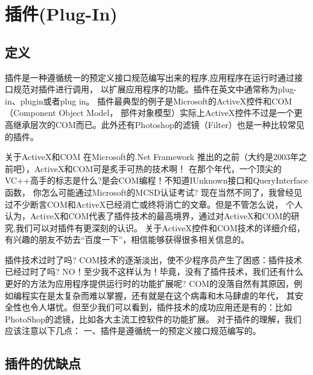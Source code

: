 \documentclass{book}
\begin{document}
\section{插件(Plug-In)}

\subsection{定义}

插件是一种遵循统一的预定义接口规范编写出来的程序,应用程序在运行时通过接口规范对插件进行调用，
以扩展应用程序的功能。插件在英文中通常称为plug-in、plugin或者plug in。
插件最典型的例子是Microsoft的ActiveX控件和COM（Component Object Model，
部件对象模型）实际上ActiveX控件不过是一个更高继承层次的COM而已。此外还有Photoshop的滤镜（Filter）也是一种比较常见的插件。

关于ActiveX和COM
在Microsoft的.Net Framework 推出的之前（大约是2003年之前吧），ActiveX和COM可是炙手可热的技术啊！
在那个年代，一个顶尖的VC++高手的标志是什么?是会COM编程！不知道IUnknown接口和QueryInterface函数，
你怎么可能通过Microsoft的MCSD认证考试?
现在当然不同了，我曾经见过不少断言COM和ActiveX已经消亡或终将消亡的文章。但是不管怎么说，
个人认为，ActiveX和COM代表了插件技术的最高境界，通过对ActiveX和COM的研究,我们可以对插件有更深刻的认识。
关于ActiveX控件和COM技术的详细介绍，有兴趣的朋友不妨去“百度一下”，相信能够获得很多相关信息的。

插件技术过时了吗?
COM技术的逐渐淡出，使不少程序员产生了困惑：插件技术已经过时了吗?
NO！至少我不这样认为！毕竟，没有了插件技术，我们还有什么更好的方法为应用程序提供运行时的功能扩展呢? 
COM的没落自然有其原因，例如编程实在是太复杂而难以掌握，还有就是在这个病毒和木马肆虐的年代，
其安全性也令人堪忧。但至少我们可以看到，插件技术的成功应用还是有的：比如PhotoShop的滤镜，比如各大主流工控软件的功能扩展。
对于插件的理解，我们应该注意以下几点：
一、插件是遵循统一的预定义接口规范编写的。

\subsection{插件的优缺点}
\end{document}
